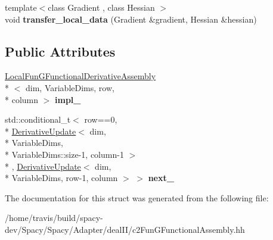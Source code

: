 \begin{DoxyCompactItemize}
\item 
\hypertarget{structSpacy_1_1dealII_1_1Detail_1_1DerivativeUpdate_a7a17089d65b40b4a6bf9ad45b39c6c60}{{\footnotesize template$<$class Gradient , class Hessian $>$ }\\void {\bfseries transfer\-\_\-local\-\_\-data} (Gradient \&gradient, Hessian \&hessian)}\label{structSpacy_1_1dealII_1_1Detail_1_1DerivativeUpdate_a7a17089d65b40b4a6bf9ad45b39c6c60}

\end{DoxyCompactItemize}
\subsection*{Public Attributes}
\begin{DoxyCompactItemize}
\item 
\hypertarget{structSpacy_1_1dealII_1_1Detail_1_1DerivativeUpdate_aaeba76d34842d0e91fd2e81c0f86963d}{\hyperlink{structSpacy_1_1dealII_1_1Detail_1_1LocalFunGFunctionalDerivativeAssembly}{Local\-Fun\-G\-Functional\-Derivative\-Assembly}\\*
$<$ dim, Variable\-Dims, row, \\*
column $>$ {\bfseries impl\-\_\-}}\label{structSpacy_1_1dealII_1_1Detail_1_1DerivativeUpdate_aaeba76d34842d0e91fd2e81c0f86963d}

\item 
\hypertarget{structSpacy_1_1dealII_1_1Detail_1_1DerivativeUpdate_a473ef25e1ff91ecccf92f4385c0f1dc5}{std\-::conditional\-\_\-t$<$ row==0, \\*
\hyperlink{structSpacy_1_1dealII_1_1Detail_1_1DerivativeUpdate}{Derivative\-Update}$<$ dim, \\*
Variable\-Dims, \\*
Variable\-Dims\-::size-\/1, column-\/1 $>$\\*
, \hyperlink{structSpacy_1_1dealII_1_1Detail_1_1DerivativeUpdate}{Derivative\-Update}$<$ dim, \\*
Variable\-Dims, row-\/1, column $>$ $>$ {\bfseries next\-\_\-}}\label{structSpacy_1_1dealII_1_1Detail_1_1DerivativeUpdate_a473ef25e1ff91ecccf92f4385c0f1dc5}

\end{DoxyCompactItemize}


The documentation for this struct was generated from the following file\-:\begin{DoxyCompactItemize}
\item 
/home/travis/build/spacy-\/dev/\-Spacy/\-Spacy/\-Adapter/deal\-I\-I/c2\-Fun\-G\-Functional\-Assembly.\-hh\end{DoxyCompactItemize}
